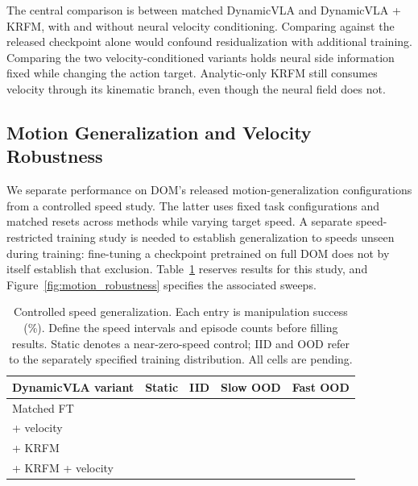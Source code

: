 \documentclass[10pt,twocolumn,letterpaper]{article}
\newcommand{\pending}{\phantom{00.00}}
\begin{document}
The central comparison is between matched DynamicVLA and DynamicVLA + KRFM,
with and without neural velocity conditioning. Comparing against the released
checkpoint alone would confound residualization with additional training.
Comparing the two velocity-conditioned variants holds neural side information
fixed while changing the action target. Analytic-only KRFM still consumes
velocity through its kinematic branch, even though the neural field does not.

\subsection{Motion Generalization and Velocity Robustness}
\label{sec:exp_generalization}

We separate performance on DOM's released motion-generalization configurations
from a controlled speed study. The latter uses fixed task configurations and
matched resets across methods while varying target speed. A separate
speed-restricted training study is needed to establish generalization to speeds
unseen during training: fine-tuning a checkpoint pretrained on full DOM does
not by itself establish that exclusion. Table~\ref{tab:speed_generalization}
reserves results for this study, and Figure~\ref{fig:motion_robustness} specifies
the associated sweeps.

\begin{table}[t]
\centering
\caption{Controlled speed generalization. Each entry is manipulation success
(\%). Define the speed intervals and episode counts before filling results.
Static denotes a near-zero-speed control; IID and OOD refer to the separately
specified training distribution. All cells are pending.}
\label{tab:speed_generalization}
\setlength{\tabcolsep}{3pt}
\small
\begin{tabular*}{\linewidth}{@{\extracolsep{\fill}}lrrrr@{}}
\toprule
DynamicVLA variant & Static & IID & Slow OOD & Fast OOD \\
\midrule
Matched FT & \pending & \pending & \pending & \pending \\
+ velocity & \pending & \pending & \pending & \pending \\
+ KRFM & \pending & \pending & \pending & \pending \\
+ KRFM + velocity & \pending & \pending & \pending & \pending \\
\bottomrule
\end{tabular*}
\end{table}
\end{document}
